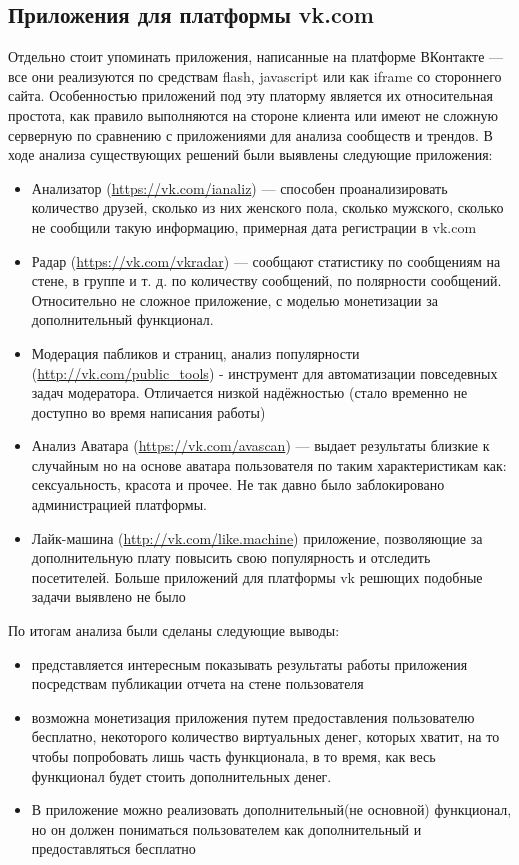 \subsection{Приложения для платформы vk.com}
Отдельно стоит упоминать приложения, написанные на платформе ВКонтакте — все они реализуются по средствам flash, javascript или как iframe со стороннего сайта. Особенностью приложений под эту платорму является их относительная простота, как правило выполняются на стороне клиента или имеют не сложную серверную по сравнению с приложениями для анализа сообществ и трендов. В ходе анализа существующих решений были выявлены следующие приложения:
\begin{itemize}
\item Анализатор (\url {https://vk.com/ianaliz}) — способен проанализировать количество друзей, сколько из них женского пола, сколько мужского, сколько не сообщили такую информацию, примерная дата регистрации в vk.com
\item Радар (\url{https://vk.com/vkradar}) — сообщают статистику по сообщениям на стене, в группе и т. д. по количеству сообщений, по полярности сообщений. Относительно не сложное приложение, с моделью монетизации за дополнительный функционал.
\item Модерация пабликов и страниц, анализ популярности (\url{http://vk.com/public_tools}) - инструмент для автоматизации повседевных задач модератора. Отличается низкой надёжностью (стало временно не доступно во время написания работы)
\item Анализ Аватара (\url{https://vk.com/avascan}) — выдает результаты близкие к случайным но на основе аватара пользователя по таким характеристикам как: сексуальность, красота и прочее. Не так давно было заблокировано администрацией платформы.
\item Лайк-машина (\url{http://vk.com/like.machine}) приложение, позволяющие за дополнительную плату повысить свою популярность и отследить посетителей.
Больше приложений для платформы vk решющих подобные задачи выявлено не было
\end{itemize}
По итогам анализа были сделаны следующие выводы:
	\begin{itemize}
	\item представляется интересным показывать результаты работы приложения посредствам публикации отчета на стене пользователя
	\item возможна монетизация приложения путем предоставления пользователю бесплатно, некоторого количество виртуальных денег, которых хватит, на то чтобы попробовать лишь часть функционала, в то время, как весь функционал будет стоить дополнительных денег.
	\item В приложение можно реализовать дополнительный(не основной) функционал, но он должен пониматься пользователем как дополнительный и предоставляться бесплатно
	\end{itemize}
